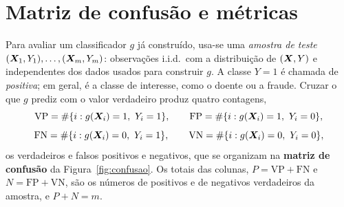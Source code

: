\documentclass[11pt,a4paper]{article}
\begin{document}
\section{Matriz de confusão e métricas}
Para avaliar um classificador $g$ já construído, usa-se uma \emph{amostra de teste}
$(\bm{X}_1,Y_1),\dots,(\bm{X}_m,Y_m)$: observações i.i.d.\ com a distribuição de $(\bm{X},Y)$ e
independentes dos dados usados para construir $g$. A classe $Y=1$ é chamada de
\emph{positiva}; em geral, é a classe de interesse, como o doente ou a fraude.
Cruzar o que $g$ prediz com o valor verdadeiro produz quatro contagens,
\[
  \text{VP}=\#\{i : g(\bm{X}_i)=1,\ Y_i=1\},\qquad
  \text{FP}=\#\{i : g(\bm{X}_i)=1,\ Y_i=0\},
\]
\[
  \text{FN}=\#\{i : g(\bm{X}_i)=0,\ Y_i=1\},\qquad
  \text{VN}=\#\{i : g(\bm{X}_i)=0,\ Y_i=0\},
\]
os verdadeiros e falsos positivos e negativos, que se organizam na \textbf{matriz de
confusão} da Figura~\ref{fig:confusao}. Os totais das colunas, $P=\text{VP}+\text{FN}$
e $N=\text{FP}+\text{VN}$, são os números de positivos e de negativos verdadeiros da
amostra, e $P+N=m$.
\end{document}
